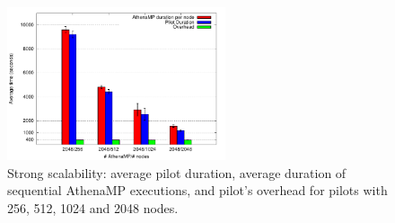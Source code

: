 \begin{figure}[!htb]
        \includegraphics[height=4.5cm,width=\columnwidth]{./figures/NGE/strong.pdf}
    \caption{Strong scalability:  average pilot duration, average duration of
    sequential AthenaMP executions, and pilot's overhead for pilots with 256, 512, 1024 and 2048 nodes.}
\label{fig:strongScala}
\end{figure}
